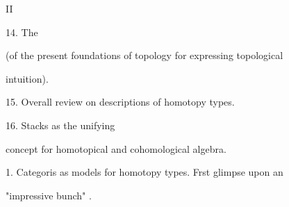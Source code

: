 \par
II \par
14.  The   \par
(of the present foundations of topology for expressing topological\par
intuition).\par
15. Overall review \hand{(}on\hand{)}  descriptions of homotopy types. \par
16.  Stacks  as the unifying\par
concept for homotopical and cohomological algebra.\par
1. Categoris as models for homotopy types. Frst glimpse upon an\par
"impressive bunch" .\par

